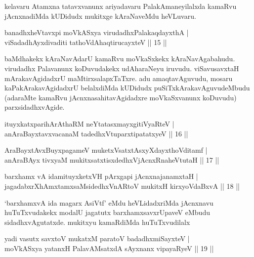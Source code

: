 \begin{artha}
kelavaru Atamxna tatavxvanunx ariyadavaru PalakAmaneyilalxda kamaRvu jAcnxnadiMda kUDidudx mukitxge kAraNaveMdu heVLuvaru.
\end{artha}


\begin{shl}
banadhxheVtavxpi moVkASxya virudadhxPalakaqdayxthA |\\
viSadadhAyxdivaditi tathoVdAhaqtirucayxteV \hfill || 15 ||
\end{shl}

\begin{artha}
baMdhakekx kAraNavAdarU kamaRvu moVkaSxkekx kAraNavAgabahudu. virudadhx Palavanunx koDuvudakekx udAharaNeyu iruvudu. viSavusavxtaH mArakavAgidadxrU maMtirxsalapxTaTxre. adu amaqtavAguvudu, mosaru kaPakArakavAgidadxrU belalxdiMda kUDidudx puSiTxkArakavAguvudeMbudu (adaraMte kamaRvu jAcnxnasahitavAgidadxre moVkaSxvanunx koDuvudu) parxsidadhxvAgide.
\end{artha}


\begin{shl}
ituyxkatxparihArAthaRM neYtatasxmayxgitiVyaRteV |\\
anAraBayxtavxvacanaM tadedhxVtuparxtipatatxyeV \hfill || 16 ||
\end{shl}
\begin{shl}
AraBayxtAvxBuyxpagameV muketxVsatxtAsxyXdayxthoVditamf |\\
anAraBAyx tivxyaM mukitxsatxtisxdedhxVjAcnxRnaheVtutaH \hfill || 17 ||
\end{shl}
\begin{shl}
barxhamx vA idamituyxketxVH pArxgapi jAcnxnajanamxtaH |\\
jagadabxrXhAmxtamxsaMsidedhxVnARtoV mukitxH kirxyoVdaBxvA \hfill || 18 ||
\end{shl}

\begin{artha}
`barxhamxvA ida magarx AsiVtf' eMdu heVLidadxriMda jAcnxnavu huTuTxvudakekx modalU jagatutx barxhamxsavxrUpaveV eMbudu sidadhxvAgutatxde. mukitxyu kamaRdiMda huTuTxvudilalx
\end{artha}

\begin{shl}
yadi vasutx savxtoV mukatxM paratoV badadhxmiSayxteV |\\
moVkASxya yatanxH PalavAMsatxdA sAyxnanx vipayaRyeV \hfill || 19 ||
\end{shl}

